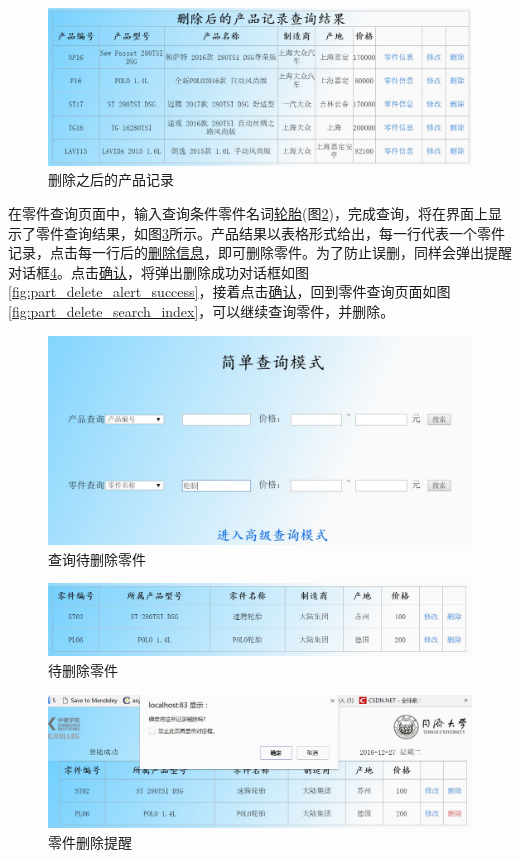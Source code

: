 \begin{figure}[H]
\centering
\includegraphics[width=0.8\linewidth]{figure/prd_deleteLV16}
\caption{删除之后的产品记录}
\label{fig:prd_deleteLV16}
\end{figure}

在零件查询页面中，输入查询条件零件名词\underline{轮胎}(图\ref{fig:part_delete_cond})，完成查询，将在界面上显示了零件查询结果，如图\ref{fig:part_delete_inf}所示。产品结果以表格形式给出，每一行代表一个零件记录，点击每一行后的\underline{删除信息}，即可删除零件。为了防止误删，同样会弹出提醒对话框\ref{fig:part_delete_alert}。点击\underline{确认}，将弹出删除成功对话框如图\ref{fig:part_delete_alert_success}，接着点击\underline{确认}，回到零件查询页面如图\ref{fig:part_delete_search_index}，可以继续查询零件，并删除。
\begin{figure}[H]
\centering
\includegraphics[width=0.8\linewidth]{figure/part_delete_cond}
\caption{查询待删除零件}
\label{fig:part_delete_cond}
\end{figure}

\begin{figure}[H]
\centering
\includegraphics[width=0.8\linewidth]{figure/part_delete_inf}
\caption{待删除零件}
\label{fig:part_delete_inf}
\end{figure}

\begin{figure}[H]
\centering
\includegraphics[width=0.8\linewidth]{figure/part_delete_alert}
\caption{零件删除提醒}
\label{fig:part_delete_alert}
\end{figure}

